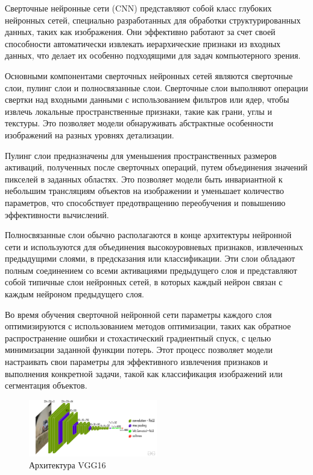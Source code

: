 Сверточные нейронные сети (CNN)\cite{lecun1989handwritten} представляют собой класс глубоких нейронных сетей, специально разработанных для обработки структурированных данных, таких как изображения. Они эффективно работают за счет своей способности автоматически извлекать иерархические признаки из входных данных, что делает их особенно подходящими для задач компьютерного зрения.

Основными компонентами сверточных нейронных сетей являются сверточные слои, пулинг слои и полносвязанные слои. Сверточные слои выполняют операции свертки над входными данными с использованием фильтров или ядер, чтобы извлечь локальные пространственные признаки, такие как грани, углы и текстуры. Это позволяет модели обнаруживать абстрактные особенности изображений на разных уровнях детализации.

Пулинг слои предназначены для уменьшения пространственных размеров активаций, полученных после сверточных операций, путем объединения значений пикселей в заданных областях. Это позволяет модели быть инвариантной к небольшим трансляциям объектов на изображении и уменьшает количество параметров, что способствует предотвращению переобучения и повышению эффективности вычислений.

Полносвязанные слои обычно располагаются в конце архитектуры нейронной сети и используются для объединения высокоуровневых признаков, извлеченных предыдущими слоями, в предсказания или классификации. Эти слои обладают полным соединением со всеми активациями предыдущего слоя и представляют собой типичные слои нейронных сетей, в которых каждый нейрон связан с каждым нейроном предыдущего слоя.

Во время обучения сверточной нейронной сети параметры каждого слоя оптимизируются с использованием методов оптимизации, таких как обратное распространение ошибки и стохастический градиентный спуск, с целью минимизации заданной функции потерь. Этот процесс позволяет модели настраивать свои параметры для эффективного извлечения признаков и выполнения конкретной задачи, такой как классификация изображений или сегментация объектов.


\begin{figure}[h]
    \centering
    \includegraphics[width=0.5\textwidth]{assets/cv/vgg16.jpg}
    \caption{Архитектура VGG16}
    \label{sd_arch}
\end{figure}




